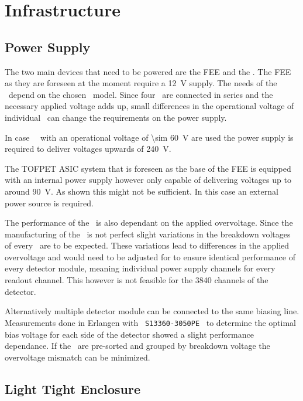 \documentclass[../BTOF_summary.tex]{subfiles}
\begin{document}
\section{Infrastructure}

\subsection{Power Supply}

The two main devices that need to be powered are the FEE and the \sipms .
The FEE as they are foreseen at the moment require a \SI{12}{V} supply.
The needs of the \sipms\ depend on the chosen \sipm\ model. Since four \sipms\ are connected in series and the necessary applied voltage adds up, small differences in the operational voltage of individual \sipms\ can change the requirements on the power supply.

In case \hamamatsu\ \sipms\ with an operational voltage of \SI{\sim 60}{V} are used the power supply is required to deliver voltages upwards of \SI{240}{V}.

The TOFPET ASIC system that is foreseen as the base of the FEE is equipped with an internal power supply however only capable of delivering voltages up to around \SI{90}{V}.
As shown this might not be sufficient.
In this case an external power source is required.

The performance of the \sipms\ is also dependant on the applied overvoltage.
Since the manufacturing of the \sipms\ is not perfect slight variations in the breakdown voltages of every \sipm\ are to be expected.
These variations lead to differences in the applied overvoltage and would need to be adjusted for to ensure identical performance of every detector module, meaning individual power supply channels for every readout channel.
This however is not feasible for the 3840 channels of the detector.

Alternatively multiple detector module can be connected to the same biasing line.
Measurements done in Erlangen with \hamamatsu\ \texttt{S13360-3050PE} \sipms\ to determine the optimal bias voltage for each side of the detector showed a slight performance dependance.
If the \sipms\ are pre-sorted and grouped by breakdown voltage the overvoltage mismatch can be minimized.

\subsection{Light Tight Enclosure}
\end{document}
